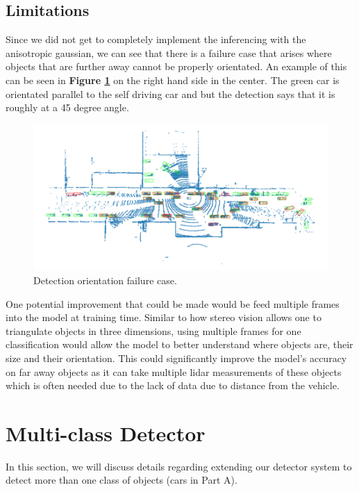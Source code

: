 \documentclass[letter]{article}
\newcommand{\fref}[1]{\textbf{Figure \ref{#1}}}
\begin{document}
	\subsection{Limitations}
	Since we did not get to completely implement the inferencing with the anisotropic gaussian, we can see that there is a failure case that arises where objects that are further away cannot be properly orientated. An example of this can be seen in \fref{fig:failure} on the right hand side in the center. The green car is orientated parallel to the self driving car and but the detection says that it is roughly at a 45 degree angle.

	\begin{figure}[h]
		\centering
		\includegraphics[scale=0.35]{images/failure.png}
		\caption{Detection orientation failure case.}
		\label{fig:failure}
	\end{figure}
	
	One potential improvement that could be made would be feed multiple frames into the model at training time. Similar to how stereo vision allows one to triangulate objects in three dimensions, using multiple frames for one classification would allow the model to better understand where objects are, their size and their orientation. This could significantly improve the model's accuracy on far away objects as it can take multiple lidar measurements of these objects which is often needed due to the lack of data due to distance from the vehicle.

	\section{Multi-class Detector}

    In this section, we will discuss details regarding extending our detector system to detect more than one class of objects (cars in Part A). 
\end{document}
